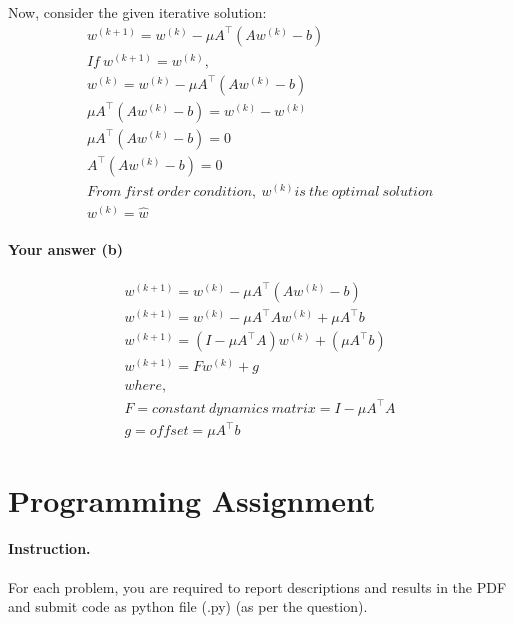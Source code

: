 \documentclass[11pt]{scrartcl}
\begin{document}
	Now, consider the given iterative solution:
	\begin{gather*}
	w^{(k+1)}=w^{(k)}-\mu A^\intercal(Aw^{(k)}-b)\\
	If\ w^{(k+1)} = w^{(k)},\\
	w^{(k)}=w^{(k)}-\mu A^\intercal(Aw^{(k)}-b)\\
	\mu A^\intercal(Aw^{(k)}-b)=w^{(k)}-w^{(k)}\\
	\mu A^\intercal(Aw^{(k)}-b) = 0\\
	A^\intercal(Aw^{(k)}-b) = 0\\
	From\ first\ order\ condition,\ w^{(k)} is\ the\ optimal\ solution\\
	w^{(k)} = \hat{w}
	\end{gather*}
	\paragraph{Your answer (b)}
	\begin{gather*}
	w^{(k+1)}=w^{(k)}-\mu A^\intercal(Aw^{(k)}-b)\\
	w^{(k+1)}=w^{(k)}-\mu A^\intercal Aw^{(k)} + \mu A^\intercal b\\
	w^{(k+1)}=(I-\mu A^\intercal A)w^{(k)} + (\mu A^\intercal b)\\
	w^{(k+1)}=Fw^{(k)} + g\\
	where,\\
	F = constant\ dynamics\ matrix = I-\mu A^\intercal A\\
	g = offset = \mu A^\intercal b
	\end{gather*}
	
	
	
	
	
	
	\newpage
	\section*{Programming Assignment}
	
	\paragraph{Instruction.}
	For each problem, you are required to report descriptions and results in the PDF and submit code as python file (.py) (as per the question). 
	
\end{document}
